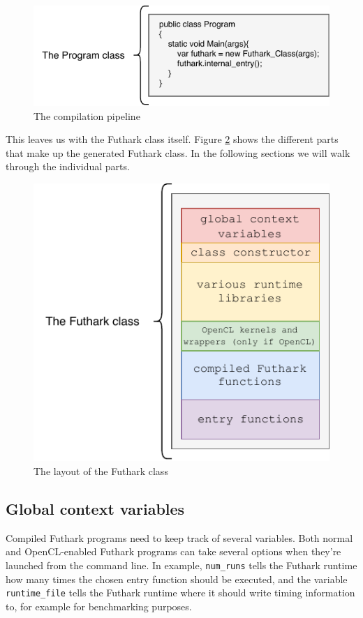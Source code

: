 \begin{figure}[h]
  \centering
  \includegraphics{chapters/figs/csharp/program_class.pdf}
  \caption{The \fshark{} compilation pipeline}
  \label{fig:programclass}
\end{figure}

This leaves us with the Futhark class itself.
Figure \ref{fig:futharkclass} shows the different parts that make up the
generated Futhark \csharp{} class. In the following sections we will walk
through the individual parts.

\begin{figure}[h]
  \centering
  \includegraphics{chapters/figs/csharp/futhark_class.pdf}
  \caption{The layout of the \csharp{} Futhark class}
  \label{fig:futharkclass}
\end{figure}

\subsection*{Global context variables}
\label{globalcontextvariables}
Compiled Futhark programs need to keep track of several variables.
Both normal and OpenCL-enabled Futhark \csharp{} programs can take several
options when they're launched from the command line. In example,
\texttt{num\_runs} tells the Futhark runtime how many times the chosen entry
function should be executed, and the variable \texttt{runtime\_file} tells the
Futhark runtime where it should write timing information to, for example for
benchmarking purposes.

